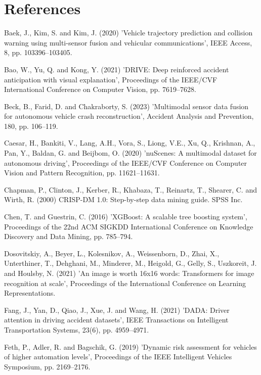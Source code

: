 \documentclass[11pt,a4paper]{article}
\begin{document}
\section*{References}
\begin{list}{}{\setlength{\itemindent}{-1.5em}\setlength{\leftmargin}{1.5em}\setlength{\itemsep}{4pt}\setlength{\parsep}{0pt}}
\item Baek, J., Kim, S. and Kim, J. (2020) 'Vehicle trajectory prediction and collision warning using multi-sensor fusion and vehicular communications', IEEE Access, 8, pp. 103396--103405.
\item Bao, W., Yu, Q. and Kong, Y. (2021) 'DRIVE: Deep reinforced accident anticipation with visual explanation', Proceedings of the IEEE/CVF International Conference on Computer Vision, pp. 7619--7628.
\item Beck, B., Farid, D. and Chakraborty, S. (2023) 'Multimodal sensor data fusion for autonomous vehicle crash reconstruction', Accident Analysis and Prevention, 180, pp. 106--119.
\item Caesar, H., Bankiti, V., Lang, A.H., Vora, S., Liong, V.E., Xu, Q., Krishnan, A., Pan, Y., Baldan, G. and Beijbom, O. (2020) 'nuScenes: A multimodal dataset for autonomous driving', Proceedings of the IEEE/CVF Conference on Computer Vision and Pattern Recognition, pp. 11621--11631.
\item Chapman, P., Clinton, J., Kerber, R., Khabaza, T., Reinartz, T., Shearer, C. and Wirth, R. (2000) CRISP-DM 1.0: Step-by-step data mining guide. SPSS Inc.
\item Chen, T. and Guestrin, C. (2016) 'XGBoost: A scalable tree boosting system', Proceedings of the 22nd ACM SIGKDD International Conference on Knowledge Discovery and Data Mining, pp. 785--794.
\item Dosovitskiy, A., Beyer, L., Kolesnikov, A., Weissenborn, D., Zhai, X., Unterthiner, T., Dehghani, M., Minderer, M., Heigold, G., Gelly, S., Uszkoreit, J. and Houlsby, N. (2021) 'An image is worth 16x16 words: Transformers for image recognition at scale', Proceedings of the International Conference on Learning Representations.
\item Fang, J., Yan, D., Qiao, J., Xue, J. and Wang, H. (2021) 'DADA: Driver attention in driving accident datasets', IEEE Transactions on Intelligent Transportation Systems, 23(6), pp. 4959--4971.
\item Feth, P., Adler, R. and Bagschik, G. (2019) 'Dynamic risk assessment for vehicles of higher automation levels', Proceedings of the IEEE Intelligent Vehicles Symposium, pp. 2169--2176.

\end{list}
\end{document}
